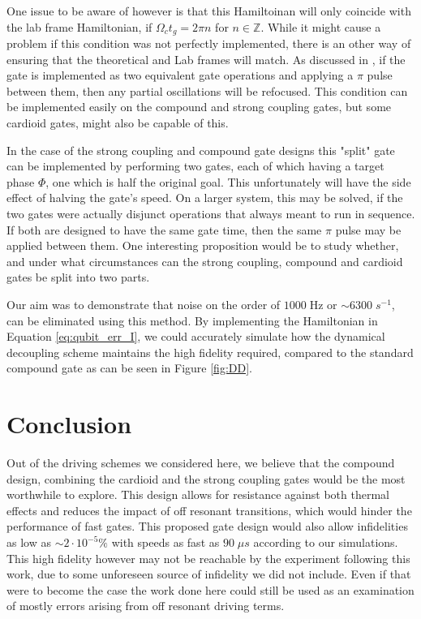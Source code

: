\documentclass[12pt,twoside]{report}
\begin{document}
One issue to be aware of however is that this Hamiltoinan will only coincide with the lab frame Hamiltonian, if $\Omega_c t_g = 2\pi n$ for $n \in \mathbb{Z}$. While it might cause a problem if this condition was not perfectly implemented, there is an other way of ensuring that the theoretical and Lab frames will match.  As discussed in \cite{DD_Paper}, if the gate is implemented as two equivalent gate operations and applying a $\pi$ pulse between them, then any partial oscillations will be refocused. This condition can be implemented easily on the compound and strong coupling gates, but some cardioid gates, might also be capable of this.

In the case of the strong coupling and compound gate designs this "split" gate can be implemented by performing two gates, each of which having a target phase $\Phi$, one which is half the original goal. This unfortunately will have the side effect of halving the gate's speed. On a larger system, this may be solved, if the two gates were actually disjunct operations that always meant to run in sequence. If both are designed to have the same gate time, then the same $\pi$ pulse may be applied between them. One interesting proposition would be to study whether, and under what circumstances can the strong coupling, compound and cardioid gates be split into two parts.

Our aim was to demonstrate that noise on the order of $1000\;\mathrm{Hz}$ or $\sim 6300\;s^{-1}$, can be eliminated using this method. By implementing the Hamiltonian in Equation \eqref{eq:qubit_err_I}, we could accurately simulate how the dynamical decoupling scheme maintains the high fidelity required, compared to the standard compound gate as can be seen in Figure \ref{fig:DD}.

\chapter{Conclusion}
\label{Conclusion}

Out of the driving schemes we considered here, we believe that the compound design, combining the cardioid and the strong coupling gates would be the most worthwhile to explore. This design allows for resistance against both thermal effects and reduces the impact of off resonant transitions, which would hinder the performance of fast gates. This proposed gate design would also allow infidelities as low as $\sim 2\cdot10^{-5}\%$ with speeds as fast as $90\;\mu s$ according to our simulations. This high fidelity however may not be reachable by the experiment following this work, due to some unforeseen source of infidelity we did not include. Even if that were to become the case the work done here could still be used as an examination of mostly errors arising from off resonant driving terms.
\end{document}
